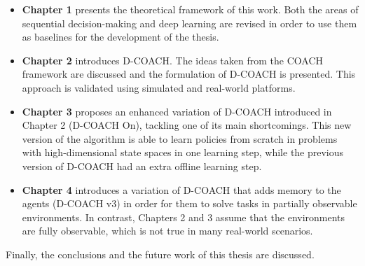 \begin{itemize}
    \item \textbf{Chapter 1} presents the theoretical framework of this work. Both the areas of sequential decision-making and deep learning are revised in order to use them as baselines for the development of the thesis.
    \item \textbf{Chapter 2} introduces D-COACH. The ideas taken from the COACH framework are discussed and the formulation of D-COACH is presented. This approach is validated using simulated and real-world platforms.
    \item \textbf{Chapter 3} proposes an enhanced variation of D-COACH introduced in Chapter 2 (D-COACH On), tackling one of its main shortcomings. This new version of the algorithm is able to learn policies from scratch in problems with high-dimensional state spaces in one learning step, while the previous version of D-COACH had an extra offline learning step.
    \item \textbf{Chapter 4} introduces a variation of D-COACH that adds memory to the agents (D-COACH v3) in order for them to solve tasks in partially observable environments. In contrast, Chapters 2 and 3 assume that the environments are fully observable, which is not true in many real-world scenarios.
\end{itemize}

Finally, the conclusions and the future work of this thesis are discussed.